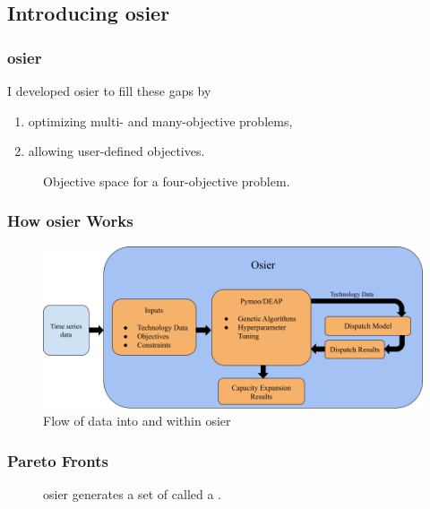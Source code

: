 \subsection{Introducing \gls{osier}}
\begin{frame}
    \frametitle{\gls{osier}}
    I developed \gls{osier} to fill these gaps by \cite{dotson_osier_2024}
    \begin{enumerate}
        \item optimizing multi- and many-objective problems,
        \item allowing user-defined objectives.
    \end{enumerate}
    
    \begin{figure}
        \centering
        \resizebox{0.95\columnwidth}{!}{}
        \caption{Objective space for a four-objective problem.}
        \label{fig:4-obj-space}
    \end{figure}
\end{frame}

\begin{frame}
    \frametitle{How \gls{osier} Works}

    \begin{figure}
        \centering
        \includegraphics[width=\columnwidth]{../docs/figures/03_osier_chapter/osier_flow.png}
        \caption{Flow of data into and within \gls{osier}}
        \label{fig:osier-flow-1}
    \end{figure}

\end{frame}

\begin{frame}
    \frametitle{Pareto Fronts}
    \begin{figure}
        \centering
        \resizebox{0.75\columnwidth}{!}{}
        \caption{\gls{osier} generates a set of  called a .}
    \end{figure}
\end{frame}

